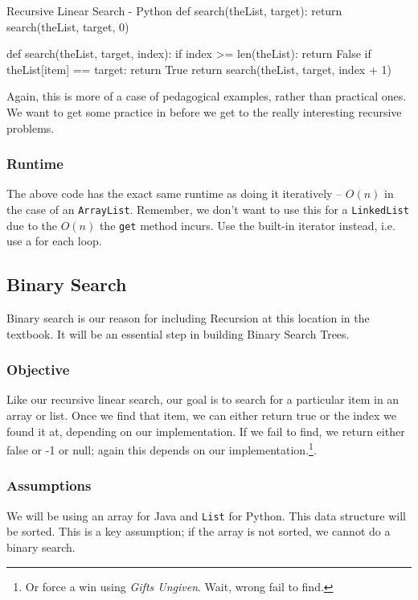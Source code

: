 \begin{pycode}{Recursive Linear Search - Python}
def search(theList, target):
	return search(theList, target, 0)

def search(theList, target, index):
	if index >= len(theList):
		return False 
	if theList[item] == target:
		return True
	return search(theList, target, index + 1)
\end{pycode}



Again, this is more of a case of pedagogical examples, rather than practical ones.  We want to get some practice in before we get to the really interesting recursive problems.  

\subsubsection{Runtime}  
The above code has the exact same runtime as doing it iteratively -- $O(n)$ in the case of an \texttt{ArrayList}. Remember, we don't want to use this for a \texttt{LinkedList} due to the $O(n)$ the \texttt{get} method incurs. Use the built-in iterator instead, i.e. use a for each loop.
\subsection{Binary Search}
Binary search is our reason for including Recursion at this location in the textbook.   It will be an essential step in building Binary Search Trees.


\subsubsection{Objective}
Like our recursive linear search, our goal is to search for a particular item in an array or list.  Once we find that item, we can either return true or the index we found it at, depending on our implementation.  If we fail to find, we return either false or -1 or null; again this depends on our implementation.\footnote{Or force a win using \textit{Gifts Ungiven}.  Wait, wrong fail to find.}.

\subsubsection{Assumptions}
We will be using an array for Java and \texttt{List} for Python.  This data structure will be sorted.  This is a key assumption;  if the array is not sorted, we cannot do a binary search.

